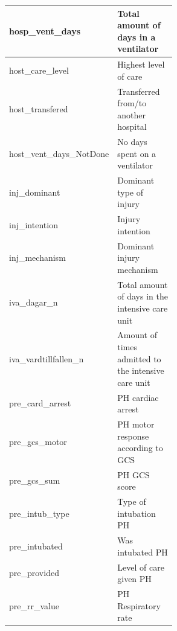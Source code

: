 \documentclass[12pt, letterpaper]{article}
\begin{document}
\begin{appendices}
\begin{longtable}[c]{@{}|l|p{0.55\linewidth}|@{}}
        hosp\_vent\_days                            & Total amount of days in a ventilator                              \\\hline
        host\_care\_level                           & Highest level of care                                             \\\hline
        host\_transfered                            & Transferred from/to another hospital                              \\\hline
        host\_vent\_days\_NotDone                   & No days spent on a ventilator                                     \\\hline
        inj\_dominant                               & Dominant type of injury                                           \\\hline
        inj\_intention                              & Injury intention                                                  \\\hline
        inj\_mechanism                              & Dominant injury mechanism                                         \\\hline
        iva\_dagar\_n                               & Total amount of days in the intensive care unit                   \\\hline
        iva\_vardtillfallen\_n                      & Amount of times admitted to the intensive care unit               \\\hline
        pre\_card\_arrest                           & PH cardiac arrest                                                 \\\hline
        pre\_gcs\_motor                             & PH motor response according to GCS                                \\\hline
        pre\_gcs\_sum                               & PH GCS score                                                      \\\hline
        pre\_intub\_type                            & Type of intubation PH                                             \\\hline
        pre\_intubated                              & Was intubated PH                                                  \\\hline
        pre\_provided                               & Level of care given PH                                            \\\hline
        pre\_rr\_value                              & PH Respiratory rate                                               \\\hline

\end{longtable}
\end{appendices}
\end{document}
